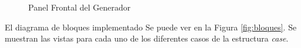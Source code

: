 \documentclass[10pt,a4paper,catalan]{article}
\begin{document}
\begin{figure}[H]
 \centering
 \hspace{.5cm}
 \hspace{.5cm}
 \hspace{.5cm}
 \caption{Panel Frontal del Generador}
 \label{fig:front-panels}
\end{figure}


El diagrama de bloques implementado Se puede ver en la Figura \ref{fig:bloques}. Se muestran las vistas para cada uno de los diferentes casos de la estructura \emph{case}.
\end{document}
